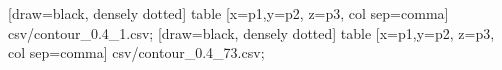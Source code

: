   [draw=black, densely dotted] table [x=p1,y=p2, z=p3, col sep=comma] {csv/contour_0.4_1.csv}; 
  [draw=black, densely dotted] table [x=p1,y=p2, z=p3, col sep=comma] {csv/contour_0.4_73.csv}; 

